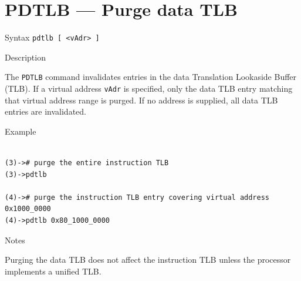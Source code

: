 %
%
\pagebreak
\section*{PDTLB — Purge data TLB}

\begin{iPageDescEntry}{Syntax}
\texttt{pdtlb [ <vAdr> ]}
\end{iPageDescEntry}

\begin{iPageDescEntry}{Description}

The \texttt{PDTLB} command invalidates entries in the data Translation
Lookaside Buffer (TLB). If a virtual address \texttt{vAdr} is specified, only the
data TLB entry matching that virtual address range is purged. If no
address is supplied, all data TLB entries are invalidated.

\end{iPageDescEntry}

\begin{iPageDescOpEntry}{Example}
\begin{lstlisting}[style=iPageOpStyle]

(3)-># purge the entire instruction TLB
(3)->pdtlb

(4)-># purge the instruction TLB entry covering virtual address 0x1000_0000
(4)->pdtlb 0x80_1000_0000

\end{lstlisting}
\end{iPageDescOpEntry}

\begin{iPageDescEntry}{Notes}

Purging the data TLB does not affect the instruction TLB unless the processor implements a unified TLB. 

\end{iPageDescEntry}
